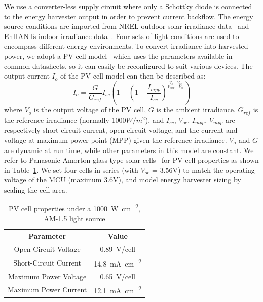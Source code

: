 We use a converter-less supply circuit where only a Schottky diode is connected to the energy harvester output in order to prevent current backflow. 
The energy source conditions are imported from NREL outdoor solar irradiance data~\cite{stoffel1981nrel} and EnHANTs indoor irradiance data~\cite{6244798}. Four sets of light conditions are used to encompass different energy environments. 
To convert irradiance into harvested power, we adopt a PV cell model~\cite{en9050326} which uses the parameters available in common datasheets, so it can easily be reconfigured to suit various devices. 
The output current $I_{o}$ of the PV cell model can then be described as:
\begin{equation} \label{eq:pvcell}
    I_{o} = \frac{G}{G_{ref}} I_{sc} (1 - (1 - \frac{I_{mpp}}{I_{sc}}) ^ {\frac{V_{o}-V_{oc}}{V_{mpp} - V_{oc}}})
\end{equation}
where $V_{o}$ is the output voltage of the PV cell, $G$ is the ambient irradiance, $G_{ref}$ is the reference irradiance (normally 1000$W/m^2$), and $I_{sc}$, $V_{oc}$, $I_{mpp}$, $V_{mpp}$ are respectively short-circuit current, open-circuit voltage, and the current and voltage at maximum power point (MPP) given the reference irradiance. 
$V_{o}$ and $G$ are dynamic at run time, while other parameters in this model are constant. 
We refer to Panasonic Amorton glass type solar cells~\cite{solarcell} for PV cell properties as shown in Table~\ref{tab:pvcell}. We set four cells in series (with $V_{oc}$ = 3.56V) to match the operating voltage of the MCU (maximum 3.6V), and model energy harvester sizing by scaling the cell area. 



\begin{table}[!t]
    \renewcommand{\arraystretch}{1.2}
    \centering
    \caption{PV cell properties under a \SI{1000}{\watt\per\square\centi\meter}, AM-1.5 light source}
    \label{tab:pvcell}
    \begin{tabular}{|c|c|}
    \hline
    \textbf{Parameter} & \textbf{Value}\\
    \hline
    Open-Circuit Voltage & \SI{0.89}{\volt}/cell\\
    Short-Circuit Current & \SI{14.8}{\milli\ampere\per\square\centi\meter}\\
    Maximum Power Voltage & \SI{0.65}{\volt}/cell\\ 
    Maximum Power Current & \SI{12.1}{\milli\ampere\per\square\centi\meter}\\
    \hline
    \end{tabular}
\end{table}

